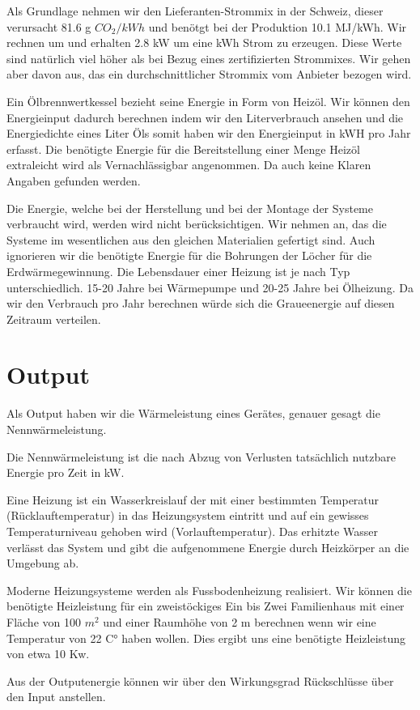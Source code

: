 Als Grundlage nehmen wir den Lieferanten-Strommix in der Schweiz\cite{bafu:strommix},
dieser verursacht 81.6 g $CO_2 /kWh$
und benötgt bei der Produktion 10.1 MJ/kWh. Wir rechnen um
und erhalten 2.8 kW um eine kWh Strom zu erzeugen.
Diese Werte sind natürlich viel höher als bei Bezug eines zertifizierten 
Strommixes. Wir gehen aber davon aus, das ein durchschnittlicher Strommix
vom Anbieter bezogen wird.

Ein Ölbrennwertkessel bezieht seine Energie in Form von Heizöl.
Wir können den Energieinput dadurch berechnen indem wir den Literverbrauch
ansehen und die Energiedichte eines Liter Öls somit haben wir den
Energieinput in kWH pro Jahr erfasst.
Die benötigte Energie für die Bereitstellung einer Menge Heizöl extraleicht
wird als Vernachlässigbar angenommen. Da auch keine Klaren Angaben gefunden
werden.

Die Energie, welche bei der Herstellung und bei der Montage der Systeme
verbraucht wird, werden wird nicht berücksichtigen.
Wir nehmen an, das die Systeme im wesentlichen aus den gleichen Materialien
gefertigt sind. Auch ignorieren wir die benötigte Energie für die Bohrungen der
Löcher für die Erdwärmegewinnung.
Die Lebensdauer einer Heizung ist je nach Typ unterschiedlich. 15-20 Jahre bei Wärmepumpe\cite{offerten24:wp} und 20-25 Jahre bei Ölheizung\cite{offerten24:oel}.
Da wir den Verbrauch pro Jahr berechnen würde sich die Graueenergie auf diesen
Zeitraum verteilen.

\section{Output}

Als Output haben wir die Wärmeleistung eines Gerätes, genauer gesagt die
Nennwärmeleistung.

Die Nennwärmeleistung ist die nach Abzug von Verlusten tatsächlich nutzbare
Energie pro Zeit in kW.\cite{heizung:nennwarmeleistung}

Eine Heizung ist ein Wasserkreislauf der mit einer bestimmten Temperatur
(Rücklauftemperatur) in das Heizungsystem eintritt und auf ein gewisses Temperaturniveau
gehoben wird (Vorlauftemperatur). Das erhitzte Wasser verlässt das System und
gibt die aufgenommene Energie durch Heizkörper an die Umgebung ab.
 
Moderne Heizungsysteme werden als Fussbodenheizung realisiert.
Wir können die benötigte Heizleistung für ein zweistöckiges Ein bis Zwei
Familienhaus mit einer Fläche von 100 $m^2$ und einer Raumhöhe von 2 m berechnen
wenn wir eine Temperatur von 22 C° haben wollen.
Dies ergibt uns eine benötigte Heizleistung von etwa 10 Kw.
\cite{heizung:berechnung}

Aus der Outputenergie können wir über den Wirkungsgrad Rückschlüsse über
den Input anstellen.










